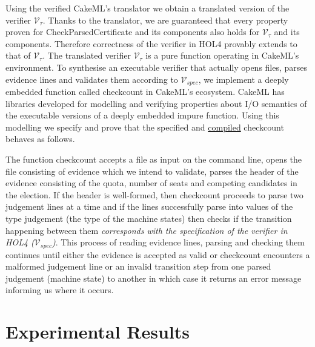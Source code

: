 \documentclass[10pt,conference]{IEEEtran}
\begin{document}
Using the verified CakeML's translator we obtain a translated version of the verifier $\mathcal{V}_{\tau}$. Thanks to the translator, we are guaranteed that every property proven for  
 Check\textunderscore{}Parsed\textunderscore{}Certificate and its components also holds for $\mathcal{V}_{\tau}$ and its components. Therefore correctness of the verifier in HOL4 provably extends to that of $\mathcal{V}_{\tau}$. The translated verifier $\mathcal{V}_{\tau}$ is a pure function operating in CakeML's environment. To synthesise an executable verifier that actually opens files, parses evidence lines and validates them according to $\mathcal{V}_{spec}$, we implement a deeply embedded function called check\textunderscore{}count in CakeML's ecosystem.  CakeML has  libraries developed for modelling and verifying properties about I/O semantics of the executable versions  of a deeply embedded impure function.  Using this modelling we specify and prove that the specified and \underline{compiled} check\textunderscore{}count behaves as follows. 
 
 The function check\textunderscore{}count accepts a file as input on the command line, opens the file consisting of  evidence which we intend to validate, parses the header of the evidence consisting of the quota, number of seats and competing candidates in the election. If the header is well-formed, then check\textunderscore{}count proceeds to parse two judgement lines at a time and if the lines  successfully parse into  values of the type judgement (the type of the machine states) then checks if  the transition happening between them \emph{corresponds with the specification of the verifier in HOL4 ($\mathcal{V}_{spec}$)}. This process of reading evidence lines, parsing and checking them continues until either the evidence is accepted as valid or  check\textunderscore{}count encounters a malformed judgement line or an invalid transition step from one parsed judgement (machine state) to another  in which case it returns an error message  informing us where it occurs.  
 
\section{Experimental Results}
\end{document}
